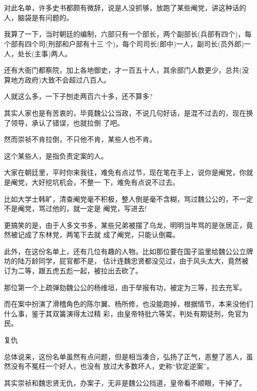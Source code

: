 \documentclass[11pt,a4paper,onecolumn]{article}
\begin{document}
\section[\thesection]{}

对此名单，许多史书都颇有微辞，说是人没抓够，放跑了某些阉党，讲这种话的人，脑袋是有问题的。

我算了一下，当时朝廷的编制，六部只有一个部长，两个副部长(兵部有四个)，每个部有四个司(刑部和户部有十三
个)，每个司司长(郎中)一人，副司长(员外郎)一人，处长(主事)两人。

还有大衙门都察院，加上各地御史，才一百五十人，其余部门人数更少，总共(没算地方政府)大致不会超过八百人。

人就这么多，一下子刨走两百六十多，还不算多?

其实人家也是有苦衷的，毕竟魏公公当政，不说几句好话，是混不过去的，现在换了领导，承认了错误，也就拉倒
了吧。

然而崇祯不肯拉倒，不只他不肯，某些人也不肯。

这个某些人，是指负责定案的人。

大家在朝廷里，平时你来我往，难免有点过节，现在笔在手上，说你是阉党，你就是阉党，大好挖坑机会，不整一
下，难免有点说不过去。

比如大学士韩旷，清查阉党毫不积极，整人倒是毫不含糊，骂过魏公公的，不一定不是阉党，骂过他的，就一定是
阉党，写进去!

更搞笑的是，由于人多文书多，某些兄弟被摆了乌龙，明明当年骂的是张居正，竟然被记成了东林党，两笔下去就
成了阉党，只能认倒霉。

此外，在这份名单上，还有几位有趣的人物。比如那位要在国子监里给魏公公立牌坊的陆万龄同学，屁官都不是，
估计连魏忠贤都没见过，由于风头太大，竟然被订为二等，跟五虎五彪一起，被拉出去砍了。

那位第一个上疏弹劾魏公公的杨维垣，由于举报有功，被定为三等，拉去充军。

而在案中扮演了滑稽角色的陈尔翼、杨所修，也没能跑掉，根据情节，本来没他们什么事，鉴于其双簧演得太过精
彩，由皇帝特批六等奖，判处有期徒刑，免官为民。

复仇

总体说来，这份名单虽然有点问题，但是相当凑合，弘扬了正气，恶整了恶人，虽然没有不冤枉一个好人，也没有
放过大多数坏人，史称``钦定逆案''。

其实崇祯和魏忠贤无仇，办案子，无非是魏公公挡道，皇帝看不顺眼，干掉了。

\section[\thesection]{}
\end{document}
